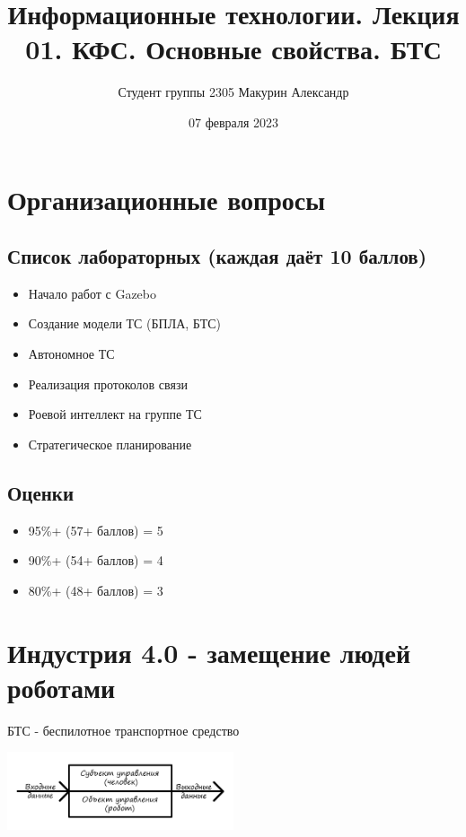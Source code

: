 \documentclass[12pt]{article}
\title{Информационные технологии. Лекция 01. КФС. Основные свойства. БТС}
\author{Студент группы 2305 Макурин Александр}
\date{07 февраля 2023}
\begin{document}
\maketitle
\begin{sloppypar}

    \section*{Организационные вопросы}
    \subsection*{Список лабораторных (каждая даёт 10 баллов)}
    \begin{itemize}
        \item Начало работ с Gazebo
        \item Создание модели ТС (БПЛА, БТС)
        \item Автономное ТС
        \item Реализация протоколов связи
        \item Роевой интеллект на группе ТС
        \item Стратегическое планирование
    \end{itemize}
    \subsection*{Оценки}
    \begin{itemize}
        \item 95\%+ (57+ баллов) = 5
        \item 90\%+ (54+ баллов) = 4
        \item 80\%+ (48+ баллов) = 3
    \end{itemize}

    \section*{Индустрия 4.0 - замещение людей роботами}

    БТС - беспилотное транспортное средство

    \includegraphics[width=0.5\textwidth]{graphics/СУ_ОУ.png}


\end{sloppypar}
\end{document}
